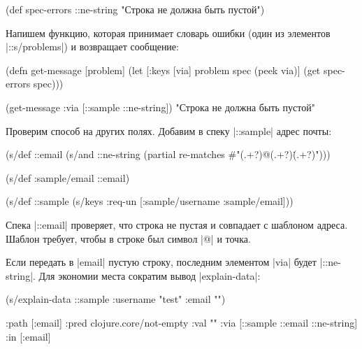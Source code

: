   \begin{clojure}
(def spec-errors
  {::ne-string "Строка не должна быть пустой"})
  \end{clojure}

Напишем функцию, которая принимает словарь ошибки (один из элементов
\spverb|::s/problems|) и возвращает сообщение:


  \begin{clojure}
(defn get-message [problem]
  (let [{:keys [via]} problem
        spec (peek via)]
    (get spec-errors spec)))

(get-message {:via [::sample ::ne-string]})
"Строка не должна быть пустой"
  \end{clojure}

Проверим способ на других полях. Добавим в спеку \spverb|::sample| адрес почты:


\begin{english}
  \begin{clojure}
(s/def ::email
  (s/and
   ::ne-string
   (partial re-matches #"(.+?)@(.+?)\.(.+?)")))

(s/def :sample/email ::email)

(s/def ::sample
  (s/keys :req-un [:sample/username
                   :sample/email]))
  \end{clojure}
\end{english}

Спека \spverb|::email| проверяет, что строка не пустая и совпадает с шаблоном
адреса. Шаблон требует, чтобы в строке был символ \spverb|@| и точка.

Если передать в \spverb|email| пустую строку, последним элементом \spverb|via|
будет \spverb|::ne-string|. Для экономии места сократим вывод
\spverb|explain-data|:

\begin{english}
  \begin{clojure}
(s/explain-data ::sample {:username "test" :email ""})

{:path [:email]
 :pred clojure.core/not-empty
 :val ""
 :via [::sample ::email ::ne-string]
 :in [:email]}
  \end{clojure}
\end{english}

